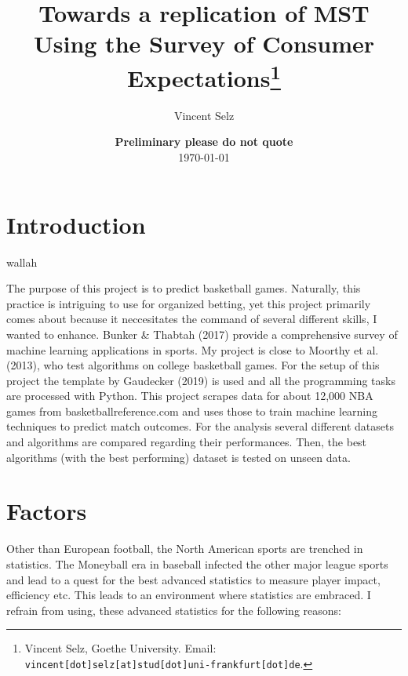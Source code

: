 \documentclass[11pt,a4paper,leqno]{article}
\title{Towards a replication of MST \\ Using the Survey of Consumer Expectations\thanks{Vincent Selz, Goethe University. Email: \texttt{vincent[dot]selz[at]stud[dot]uni-frankfurt[dot]de}. } }
\author{Vincent Selz}
\date{
	{\bf Preliminary \-\- please do not quote}
	\\[1ex]
	\today
}
\begin{document}
\maketitle


\clearpage
\section{Introduction}

\textcite{Zimbo} wallah

The purpose of this project is to predict basketball games. Naturally, this practice is intriguing to use for organized betting, yet this project primarily comes about because it neccesitates the command of several different skills, I wanted to enhance. Bunker \& Thabtah (2017) provide a comprehensive survey of machine learning applications in sports. My project is close to Moorthy et al. (2013), who test algorithms on college basketball games. For the setup of this project the template by Gaudecker (2019) is used and all the programming tasks are processed with Python. This project scrapes data for about 12,000 NBA games from basketball\-reference.com and uses those to train machine learning techniques to predict match outcomes. For the analysis several different datasets and algorithms are compared regarding their performances. Then, the best algorithms (with the best performing) dataset is tested on unseen data.


\section{Factors}


Other than European football, the North American sports are trenched in statistics. The Moneyball era in baseball infected the other major league sports and lead to a quest for the best advanced statistics to measure player impact, efficiency etc. This leads to an environment where statistics are embraced. I refrain from using, these advanced statistics for the following reasons:
\end{document}
